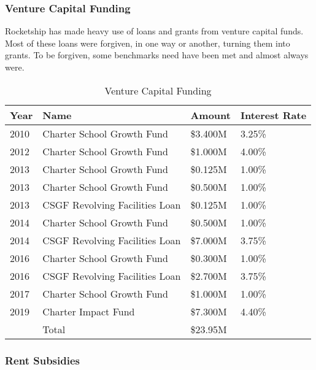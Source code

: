 \subsubsection{Venture Capital Funding}%
\label{sec:venture-capital_funding}\indent%

Rocketship has made heavy use of loans and grants from venture capital funds. Most of these loans were forgiven, in one way or another, turning them into grants. To be forgiven, some benchmarks need have been met and almost always were.

\begin{table}[ht]
  \SingleSpacing
  \caption{Venture Capital Funding}%
  \label{tab:venture_captial_funding}
  \begin{tabular}{llll}
    \toprule
    Year & Name                           & Amount   & Interest Rate \\
    \midrule
    2010 & Charter School Growth Fund     & \$3.400M & 3.25\%        \\
    2012 & Charter School Growth Fund     & \$1.000M & 4.00\%        \\
    2013 & Charter School Growth Fund     & \$0.125M & 1.00\%        \\
    2013 & Charter School Growth Fund     & \$0.500M & 1.00\%        \\
    2013 & CSGF Revolving Facilities Loan & \$0.125M & 1.00\%        \\
    2014 & Charter School Growth Fund     & \$0.500M & 1.00\%        \\
    2014 & CSGF Revolving Facilities Loan & \$7.000M & 3.75\%        \\
    2016 & Charter School Growth Fund     & \$0.300M & 1.00\%        \\
    2016 & CSGF Revolving Facilities Loan & \$2.700M & 3.75\%        \\
    2017 & Charter School Growth Fund     & \$1.000M & 1.00\%        \\
    2019 & Charter Impact Fund            & \$7.300M & 4.40\%        \\
    \midrule
         & Total                          & \$23.95M &               \\
    \bottomrule
  \end{tabular}
\end{table}

\subsubsection{Rent Subsidies}%
\label{sec:rent-subsidies}\indent%

